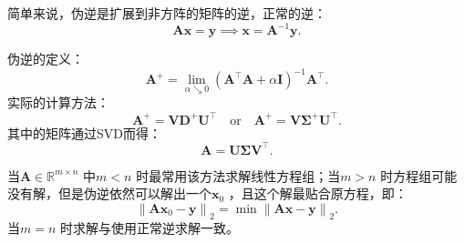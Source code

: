 简单来说，伪逆是扩展到非方阵的矩阵的逆，正常的逆：\[
    \bm{Ax} = \bm{y} \implies \bm{x} = \bm{A}^{-1}\bm{y}
.\]
\begin{defi}
    伪逆的定义：\[
        \bm{A}^{+} = \lim_{\alpha \searrow 0} \left( \bm{A}^\top \bm{A}+\alpha \bm{I} \right)^{-1}\bm{A}^\top 
    .\]
    实际的计算方法：\[
        \bm{A}^{+}=\bm{V}\bm{D}^{+}\bm{U}^\top\quad  \text{or} \quad \bm{A}^{+}=\bm{V}\bm{\Sigma}^{+}\bm{U}^\top
    .\]
    其中的矩阵通过SVD而得：\[
        \bm{A} = \bm{U}\bm{\Sigma}\bm{V}^\top 
    .\]
\end{defi}
当$\bm{A}\in \mathbb{R}^{m \times n}$ 中$m<n$ 时最常用该方法求解线性方程组；当$m>n$ 时方程组可能没有解，但是伪逆依然可以解出一个$\bm{x}_0$ ，且这个解最贴合原方程，即：\[
    \left\lVert \bm{Ax}_0-\bm{y} \right\rVert_{2} = \min \left\lVert \bm{Ax}-\bm{y} \right\rVert_{2}
.\]
当$m=n$ 时求解与使用正常逆求解一致。
